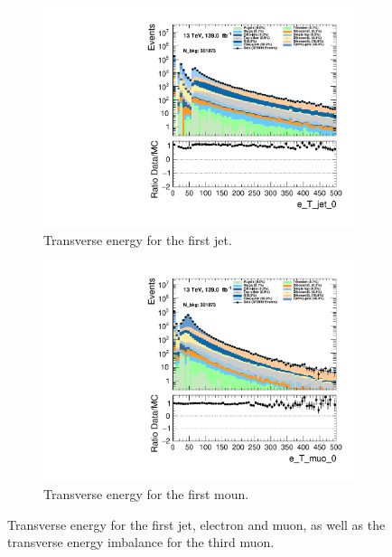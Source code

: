 \begin{figure}
\begin{subfigure}{.49\textwidth}
        \includegraphics[width=\textwidth]{Figures/MC_Data_comp/e_T_jet_0.pdf}
        \caption{Transverse energy for the first jet. }
        \label{fig:e_T_jet0}
    \end{subfigure}
    \hfill
    \begin{subfigure}{.49\textwidth}
        \includegraphics[width=\textwidth]{Figures/MC_Data_comp/e_T_muo_0.pdf}
        \caption{Transverse energy for the first moun. }
        \label{fig:e_T_muo0}
    \end{subfigure}
    \hfill       
    \caption{Transverse energy for the first jet, electron and muon, as well as the transverse energy imbalance for the third muon. }
    \label{fig:batch2_feats}
\end{figure}

